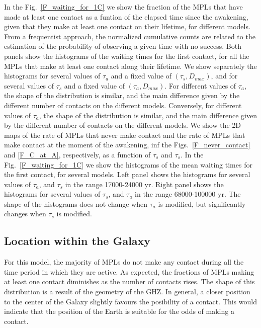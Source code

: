 In the Fig.~\ref{F_waiting_for_1C} we show the fraction of the MPLs
that have made at least one contact as a funtion of the elapsed time
since the awakening, given that they make at least one contact on
their lifetime, for different models.
%
From a frequentist approach, the normalized cumulative counts are
related to the estimation of the probability of observing a given time
with no success.
%             
Both panels show the histograms of the waiting times for the first
contact, for all the MPLs that make at least one contact along their
lifetime.
%
We show separately the histograms for several values of $\tau_a$ and a
fixed value of $(\tau_s, D_{max})$, and for several values of $\tau_s$
and a fixed value of $(\tau_a, D_{max})$.
%
For different values of $\tau_a$, the shape of the distribution is
similar, and the main difference given by the different number of
contacts on the different models.
%
Conversely, for different values of $\tau_a$, the shape of the
distribution is similar, and the main difference given by the
different number of contacts on the different models. 
%
We show the 2D maps of the rate of MPLs that never make contact and
the rate of MPLs that make contact at the moment of the awakening,
inf the Figs.~\ref{F_never_contact} and \ref{F_C_at_A}, respectively,
as a function of $\tau_s$ and $\tau_s$.
%
In the Fig.~\ref{F_waiting_for_1C} we show the histograms of the mean
waiting times for the first contact, for several models.
%
Left panel shows the histograms for several values of $\tau_a$, and
$\tau_s$ in the range 17000-24000 yr.
%
Right panel shows the histograms for several values of $\tau_s$, and
$\tau_a$ in the range 68000-100000 yr.
%
The shape of the histograms does not change when $\tau_a$ is modified,
but significantly changes when $\tau_s$ is modified.


                   
          

\subsection{Location within the Galaxy}\label{SS_location}
    
%
For this model, the majority of MPLs do not make any contact during
all the time period in which they are active.
%
As expected, the fractions of MPLs making at least one contact
diminishes as the number of contacts rises.
%
The shape of this distribution is a result of the geometry of the GHZ.
%
In general, a closer position to the center of the Galaxy slightly
favours the posibility of a contact.
%
This would indicate that the position of the Earth is suitable for the
odds of making a contact.

